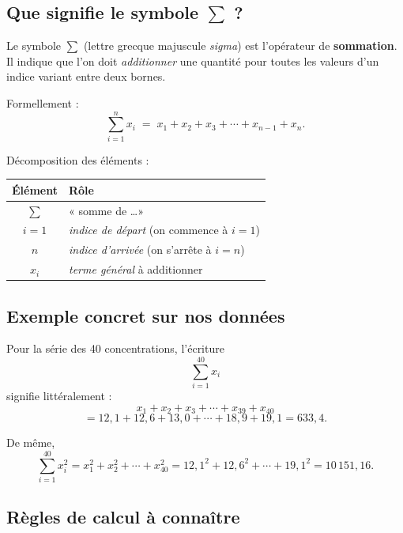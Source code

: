 \documentclass[11pt,a4paper]{article}
\begin{document}
\subsection{Que signifie le symbole \(\sum\) ?}

Le symbole \(\sum\) (lettre grecque majuscule \emph{sigma}) est
l'opérateur de \textbf{sommation}. Il indique que l'on doit
\emph{additionner} une quantité pour toutes les valeurs d'un
indice variant entre deux bornes.

\medskip
\noindent Formellement :
\[
\sum_{i=1}^{n} x_i
\;=\;
x_1 + x_2 + x_3 + \cdots + x_{n-1} + x_n.
\]

\noindent Décomposition des éléments :
\begin{center}
\begin{tabular}{|c|l|}
\hline
\rowcolor{calchead}
\textbf{Élément} & \textbf{Rôle} \\ \hline
\( \sum \)        & « somme de \dots » \\ \hline
\( i = 1 \)       & \emph{indice de départ} (on commence à \( i = 1 \)) \\ \hline
\( n \)           & \emph{indice d'arrivée} (on s'arrête à \( i = n \)) \\ \hline
\( x_i \)         & \emph{terme général} à additionner \\ \hline
\end{tabular}
\end{center}

\subsection{Exemple concret sur nos données}

Pour la série des 40 concentrations, l'écriture
\[
\sum_{i=1}^{40} x_i
\]
signifie littéralement :
\[
x_1 + x_2 + x_3 + \cdots + x_{39} + x_{40}
\]
\[
= 12{,}1 + 12{,}6 + 13{,}0 + \cdots + 18{,}9 + 19{,}1 = 633{,}4.
\]

De même,
\[
\sum_{i=1}^{40} x_i^2 = x_1^2 + x_2^2 + \cdots + x_{40}^2
= 12{,}1^2 + 12{,}6^2 + \cdots + 19{,}1^2 = 10\,151{,}16.
\]

\subsection{Règles de calcul à connaître}
\end{document}
